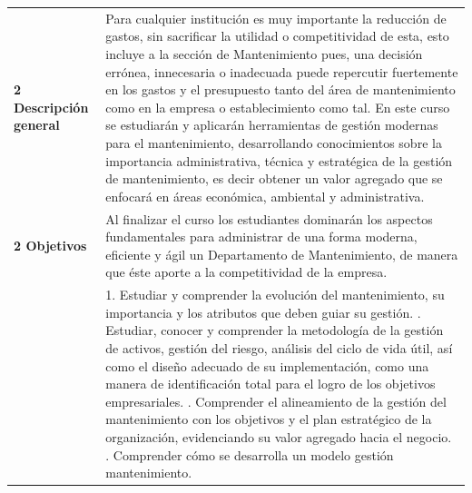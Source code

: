 \documentclass[letterpaper]{article}%
\begin{document}
\newpage%
\renewcommand{\arraystretch}{1.5}%
\begin{longtable}{p{}p{}}%
\par\fontsize{12}{0}\selectfont \textbf{\textcolor{parte}{2 Descripción general}}&Para cualquier institución es muy importante la reducción de gastos, sin sacrificar la utilidad o competitividad de esta, esto incluye a la sección de Mantenimiento pues, una decisión errónea, innecesaria o inadecuada puede repercutir fuertemente en los gastos y el presupuesto tanto del área de mantenimiento como en la empresa o establecimiento como tal. 
\newline%
En este curso se estudiarán y aplicarán herramientas de gestión modernas para el mantenimiento, desarrollando conocimientos sobre la importancia administrativa, técnica y estratégica de la gestión de mantenimiento, es decir obtener un valor agregado que se enfocará en áreas económica, ambiental y administrativa.\\%
\par\fontsize{12}{0}\selectfont \textbf{\textcolor{parte}{2 Objetivos}}&Al finalizar el curso los estudiantes dominarán los aspectos fundamentales para administrar de una forma moderna, eficiente y ágil un Departamento de Mantenimiento, de manera que éste aporte a la competitividad de la empresa.\\%
&1. Estudiar y comprender la evolución del mantenimiento, su importancia y los atributos que deben guiar su gestión. 
\newline%
      2. Estudiar, conocer y comprender la metodología de la gestión de activos, gestión del riesgo, análisis del ciclo de vida útil, así como el diseño adecuado de su implementación, como una manera de identificación total para el logro de los objetivos empresariales.
\newline%
       3. Comprender el alineamiento de la gestión del mantenimiento con los objetivos y el plan estratégico de la organización, evidenciando su valor agregado hacia el negocio. 
\newline%
       4. Comprender cómo se desarrolla un modelo gestión mantenimiento.\\%
\end{longtable}%
\end{document}

